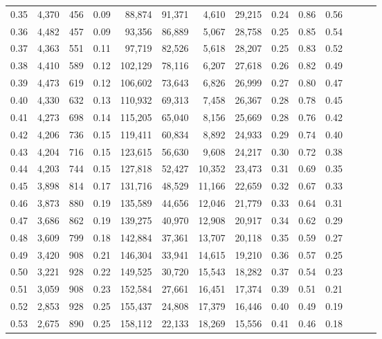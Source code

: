 \begin{tabular}{rrrrrrrrrrrrrr}
0.35 &  4,370 &  456 &  0.09 &   88,874 &   91,371 &   4,610 &  29,215 &  0.24 &  0.86 &      0.56 \\
0.36 &  4,482 &  457 &  0.09 &   93,356 &   86,889 &   5,067 &  28,758 &  0.25 &  0.85 &      0.54 \\
0.37 &  4,363 &  551 &  0.11 &   97,719 &   82,526 &   5,618 &  28,207 &  0.25 &  0.83 &      0.52 \\
0.38 &  4,410 &  589 &  0.12 &  102,129 &   78,116 &   6,207 &  27,618 &  0.26 &  0.82 &      0.49 \\
0.39 &  4,473 &  619 &  0.12 &  106,602 &   73,643 &   6,826 &  26,999 &  0.27 &  0.80 &      0.47 \\
0.40 &  4,330 &  632 &  0.13 &  110,932 &   69,313 &   7,458 &  26,367 &  0.28 &  0.78 &      0.45 \\
0.41 &  4,273 &  698 &  0.14 &  115,205 &   65,040 &   8,156 &  25,669 &  0.28 &  0.76 &      0.42 \\
0.42 &  4,206 &  736 &  0.15 &  119,411 &   60,834 &   8,892 &  24,933 &  0.29 &  0.74 &      0.40 \\
0.43 &  4,204 &  716 &  0.15 &  123,615 &   56,630 &   9,608 &  24,217 &  0.30 &  0.72 &      0.38 \\
0.44 &  4,203 &  744 &  0.15 &  127,818 &   52,427 &  10,352 &  23,473 &  0.31 &  0.69 &      0.35 \\
0.45 &  3,898 &  814 &  0.17 &  131,716 &   48,529 &  11,166 &  22,659 &  0.32 &  0.67 &      0.33 \\
0.46 &  3,873 &  880 &  0.19 &  135,589 &   44,656 &  12,046 &  21,779 &  0.33 &  0.64 &      0.31 \\
0.47 &  3,686 &  862 &  0.19 &  139,275 &   40,970 &  12,908 &  20,917 &  0.34 &  0.62 &      0.29 \\
0.48 &  3,609 &  799 &  0.18 &  142,884 &   37,361 &  13,707 &  20,118 &  0.35 &  0.59 &      0.27 \\
0.49 &  3,420 &  908 &  0.21 &  146,304 &   33,941 &  14,615 &  19,210 &  0.36 &  0.57 &      0.25 \\
0.50 &  3,221 &  928 &  0.22 &  149,525 &   30,720 &  15,543 &  18,282 &  0.37 &  0.54 &      0.23 \\
0.51 &  3,059 &  908 &  0.23 &  152,584 &   27,661 &  16,451 &  17,374 &  0.39 &  0.51 &      0.21 \\
0.52 &  2,853 &  928 &  0.25 &  155,437 &   24,808 &  17,379 &  16,446 &  0.40 &  0.49 &      0.19 \\
0.53 &  2,675 &  890 &  0.25 &  158,112 &   22,133 &  18,269 &  15,556 &  0.41 &  0.46 &      0.18 \\

\end{tabular}
